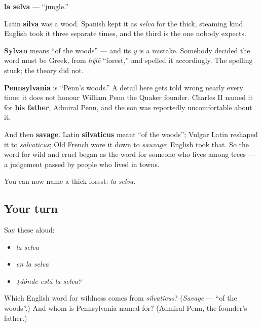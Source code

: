 \begin{cousinweb}
\textbf{la selva} — \textquotedblleft{}jungle.\textquotedblright{}

Latin \textbf{silva} was a wood. Spanish kept it as \emph{selva} for the thick, steaming kind. English took it three separate times, and the third is the one nobody expects.

\textbf{Sylvan} means \textquotedblleft{}of the woods\textquotedblright{} — and its \emph{y} is a mistake. Somebody decided the word must be Greek, from \emph{hýlē} \textquotedblleft{}forest,\textquotedblright{} and spelled it accordingly. The spelling stuck; the theory did not.

\textbf{Pennsylvania} is \textquotedblleft{}Penn's woods.\textquotedblright{} A detail here gets told wrong nearly every time: it does not honour William Penn the Quaker founder. Charles II named it for \textbf{his father}, Admiral Penn, and the son was reportedly uncomfortable about it.

And then \textbf{savage}. Latin \textbf{silvaticus} meant \textquotedblleft{}of the woods\textquotedblright{}; Vulgar Latin reshaped it to \emph{salvaticus}; Old French wore it down to \emph{sauvage}; English took that. So the word for wild and cruel began as the word for someone who lives among trees — a judgement passed by people who lived in towns.
\end{cousinweb}

\begin{grammarlens}[title={What you've built}]
You can now name a thick forest: \emph{la selva}.
\end{grammarlens}

\subsection*{Your turn}
Say these aloud:

\begin{itemize}
\raggedright
  \item \emph{la selva}
  \item \emph{en la selva}
  \item \emph{¿dónde está la selva?}
\end{itemize}

\begin{tcolorbox}[breakable,colback=teal!4,colframe=teal!35!black,title={Before you move on}]
Which English word for wildness comes from \emph{silvaticus}? (\emph{Savage} — \textquotedblleft{}of the woods\textquotedblright{}.) And whom is Pennsylvania named for? (Admiral Penn, the founder's father.)
\end{tcolorbox}
